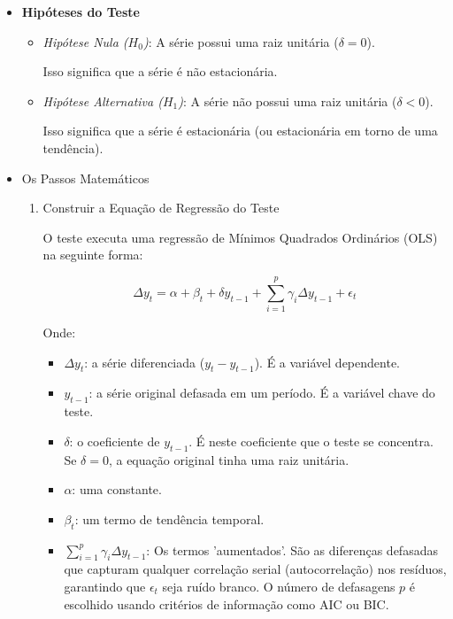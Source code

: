 \documentclass[ 12pt,a4paper ]{article} %
\begin{document}
	\begin{itemize}
		\item \textbf{Hipóteses do Teste}
		
			\begin{itemize}
		\item \textit{Hipótese Nula ($H_0$)}: A série possui uma raiz unitária ($\delta=0$).
		
		Isso significa que a série é não estacionária.
		
		\item \textit{Hipótese Alternativa ($H_1$)}: A série não possui uma raiz unitária ($\delta<0$).
		
		Isso significa que a série é estacionária (ou estacionária em torno de uma tendência).
			\end{itemize}
			
		\item Os Passos Matemáticos
		
		\begin{enumerate}
			\item Construir a Equação de Regressão do Teste
			
			O teste executa uma regressão de Mínimos Quadrados Ordinários (OLS) na seguinte forma:
			
			$$\Delta y_t= \alpha + \beta_t + \delta y_{t-1} + \sum_{i=1}^{p} \gamma_i \Delta y_{t-1} +\epsilon_t $$
			
			Onde:
			\begin{itemize}
				
				\item $\Delta y_t$: a série diferenciada ($y_t- y_{t-1}$). É a variável dependente.
				
				\item $y_{t-1}$: a série original defasada em um período. É a variável chave do teste.
				
				\item $\delta$: o coeficiente de $y_{t-1}$.  É neste coeficiente que o teste se concentra. Se  $\delta=0$, a equação original tinha uma raiz unitária.
				
				\item $\alpha$: uma constante.
				
				\item $\beta_t$: um termo de tendência temporal.
				
				\item $\sum_{i=1}^{p} \gamma_i \Delta y_{t-1}$: Os termos 'aumentados'. São as diferenças defasadas que capturam qualquer correlação serial (autocorrelação) nos resíduos, garantindo que 	$\epsilon_t $ seja ruído branco. O número de defasagens $p$ é escolhido usando critérios de informação como AIC ou BIC.
			\end{itemize}
			

\end{enumerate}
\end{itemize}
\end{document}
